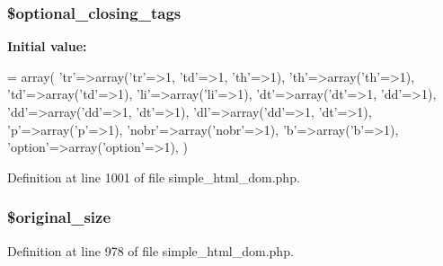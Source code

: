 \subsubsection[{\$optional\+\_\+closing\+\_\+tags}]{\setlength{\rightskip}{0pt plus 5cm}\$optional\+\_\+closing\+\_\+tags\hspace{0.3cm}{\ttfamily [protected]}}\label{classsimple__html__dom_a0aa8137deceff2940ae24f30bdb37379}
{\bfseries Initial value\+:}
\begin{DoxyCode}
= array(
        \textcolor{stringliteral}{'tr'}=>array(\textcolor{stringliteral}{'tr'}=>1, \textcolor{stringliteral}{'td'}=>1, \textcolor{stringliteral}{'th'}=>1),
        \textcolor{stringliteral}{'th'}=>array(\textcolor{stringliteral}{'th'}=>1),
        \textcolor{stringliteral}{'td'}=>array(\textcolor{stringliteral}{'td'}=>1),
        \textcolor{stringliteral}{'li'}=>array(\textcolor{stringliteral}{'li'}=>1),
        \textcolor{stringliteral}{'dt'}=>array(\textcolor{stringliteral}{'dt'}=>1, \textcolor{stringliteral}{'dd'}=>1),
        \textcolor{stringliteral}{'dd'}=>array(\textcolor{stringliteral}{'dd'}=>1, \textcolor{stringliteral}{'dt'}=>1),
        \textcolor{stringliteral}{'dl'}=>array(\textcolor{stringliteral}{'dd'}=>1, \textcolor{stringliteral}{'dt'}=>1),
        \textcolor{charliteral}{'p'}=>array(\textcolor{charliteral}{'p'}=>1),
        \textcolor{stringliteral}{'nobr'}=>array(\textcolor{stringliteral}{'nobr'}=>1),
        \textcolor{charliteral}{'b'}=>array(\textcolor{charliteral}{'b'}=>1),
        \textcolor{stringliteral}{'option'}=>array(\textcolor{stringliteral}{'option'}=>1),
    )
\end{DoxyCode}


Definition at line 1001 of file simple\+\_\+html\+\_\+dom.\+php.

\hypertarget{classsimple__html__dom_ac22338e9abaeaf63325d69086f9ac644}{}
\subsubsection[{\$original\+\_\+size}]{\setlength{\rightskip}{0pt plus 5cm}\$original\+\_\+size}\label{classsimple__html__dom_ac22338e9abaeaf63325d69086f9ac644}


Definition at line 978 of file simple\+\_\+html\+\_\+dom.\+php.

\hypertarget{classsimple__html__dom_a4e2313a4b35b72a06ac45fd38960f677}{}
